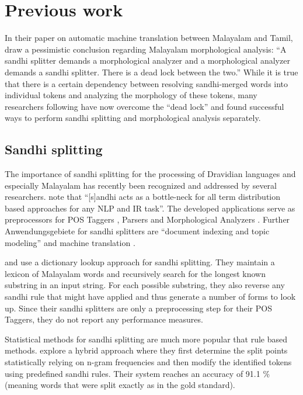 \documentclass[a4paper]{article}
\begin{document}
\section{Previous work}

In their \citeyear{jayan2011translation} paper on automatic machine translation between Malayalam and Tamil, \citeauthor{jayan2011translation} draw a pessimistic conclusion regarding Malayalam morphological analysis: ``A sandhi splitter demands a morphological analyzer and a morphological analyzer demands a sandhi splitter. There is a dead lock between the two.'' While it is true that there is a certain dependency between resolving sandhi-merged words into individual tokens and analyzing the morphology of these tokens, many researchers following \textcite{jayan2011translation} have now overcome the ``dead lock'' and found successful ways to perform sandhi splitting and morphological analysis separately.

\subsection{Sandhi splitting}

The importance of sandhi splitting for the processing of Dravidian languages and especially Malayalam has recently been recognized and addressed by several researchers. \textcite{devadath2014sandhi} note that ``[s]andhi acts as a bottle-neck for all term distribution based approaches for any NLP and IR task''. The developed applications serve as preprocessors for POS Taggers \parencite{manju2009pos,bindu2011pos}, Parsers \parencite{devadath2016parser} and Morphological Analyzers \parencite{sebastian2018morph}. Further Anwendungsgebiete for sandhi splitters are ``document indexing and topic modeling'' \parencite{nisha2016sandhi} and machine translation \parencite{jayan2011translation}.

\textcite{manju2009pos} and \textcite{bindu2011pos} use a dictionary lookup approach for sandhi splitting. They maintain a lexicon of Malayalam words and recursively search for the longest known substring in an input string. For each possible substring, they also reverse any sandhi rule that might have applied and thus generate a number of forms to look up. Since their sandhi splitters are only a preprocessing step for their POS Taggers, they do not report any performance measures.

Statistical methods for sandhi splitting are much more popular that rule based methods. \textcite{devadath2014sandhi} explore a hybrid approach where they first determine the split points statistically relying on n-gram frequencies and then modify the identified tokens using predefined sandhi rules. Their system reaches an accuracy of 91.1 \% (meaning words that were split exactly as in the gold standard).
\end{document}
